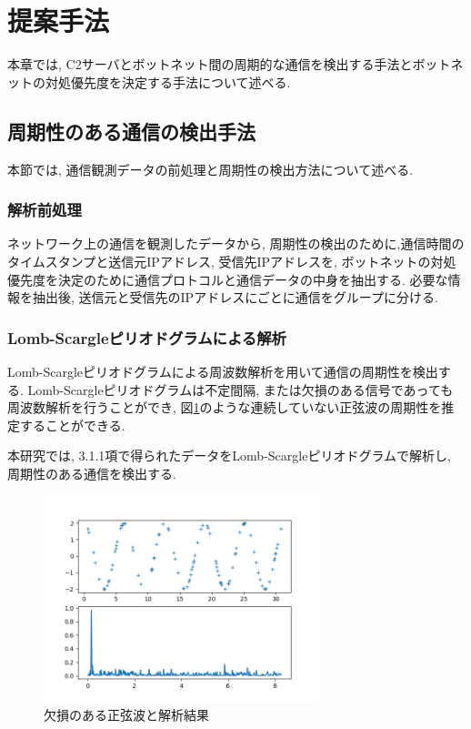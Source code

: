 \documentclass[twocolumn,9pt]{ltjsarticle}
\begin{document}
\section{提案手法}
本章では, C2サーバとボットネット間の周期的な通信を検出する手法とボットネットの対処優先度を決定する手法について述べる. 

\subsection{周期性のある通信の検出手法}
本節では, 通信観測データの前処理と周期性の検出方法について述べる. 

\subsubsection{解析前処理}
ネットワーク上の通信を観測したデータから, 周期性の検出のために,通信時間のタイムスタンプと送信元IPアドレス, 受信先IPアドレスを, ボットネットの対処優先度を決定のために通信プロトコルと通信データの中身を抽出する. 必要な情報を抽出後, 送信元と受信先のIPアドレスにごとに通信をグループに分ける. 

\subsubsection{Lomb-Scargleピリオドグラムによる解析}
Lomb-Scargleピリオドグラムによる周波数解析\cite{vanderplas2018understanding}を用いて通信の周期性を検出する. Lomb-Scargleピリオドグラムは不定間隔, または欠損のある信号であっても周波数解析を行うことができ, 図\ref{fig:lombscargle}のような連続していない正弦波の周期性を推定することができる. 

本研究では, 3.1.1項で得られたデータをLomb-Scargleピリオドグラムで解析し, 周期性のある通信を検出する. 

\begin{figure}[htbp]
    \centering

    \includegraphics[width=8cm]{images/【M2中間発表】周期的な通信によるボットネット検出と対処優先度決定手法の提案/lombscargle.png}

    \caption{欠損のある正弦波と解析結果}
    \label{fig:lombscargle}
\end{figure}
\end{document}
